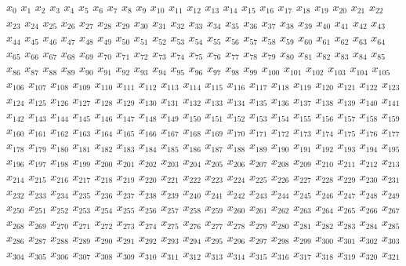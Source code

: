 \begin{diagram}[id="d", label="math cap"]
\end{diagram}

$x_{0}$ $x_{1}$ $x_{2}$ $x_{3}$ $x_{4}$ $x_{5}$ $x_{6}$ $x_{7}$ $x_{8}$ $x_{9}$ $x_{10}$ $x_{11}$ $x_{12}$ $x_{13}$ $x_{14}$ $x_{15}$ $x_{16}$ $x_{17}$ $x_{18}$ $x_{19}$ $x_{20}$ $x_{21}$ $x_{22}$ $x_{23}$ $x_{24}$ $x_{25}$ $x_{26}$ $x_{27}$ $x_{28}$ $x_{29}$ $x_{30}$ $x_{31}$ $x_{32}$ $x_{33}$ $x_{34}$ $x_{35}$ $x_{36}$ $x_{37}$ $x_{38}$ $x_{39}$ $x_{40}$ $x_{41}$ $x_{42}$ $x_{43}$ $x_{44}$ $x_{45}$ $x_{46}$ $x_{47}$ $x_{48}$ $x_{49}$ $x_{50}$ $x_{51}$ $x_{52}$ $x_{53}$ $x_{54}$ $x_{55}$ $x_{56}$ $x_{57}$ $x_{58}$ $x_{59}$ $x_{60}$ $x_{61}$ $x_{62}$ $x_{63}$ $x_{64}$ $x_{65}$ $x_{66}$ $x_{67}$ $x_{68}$ $x_{69}$ $x_{70}$ $x_{71}$ $x_{72}$ $x_{73}$ $x_{74}$ $x_{75}$ $x_{76}$ $x_{77}$ $x_{78}$ $x_{79}$ $x_{80}$ $x_{81}$ $x_{82}$ $x_{83}$ $x_{84}$ $x_{85}$ $x_{86}$ $x_{87}$ $x_{88}$ $x_{89}$ $x_{90}$ $x_{91}$ $x_{92}$ $x_{93}$ $x_{94}$ $x_{95}$ $x_{96}$ $x_{97}$ $x_{98}$ $x_{99}$ $x_{100}$ $x_{101}$ $x_{102}$ $x_{103}$ $x_{104}$ $x_{105}$ $x_{106}$ $x_{107}$ $x_{108}$ $x_{109}$ $x_{110}$ $x_{111}$ $x_{112}$ $x_{113}$ $x_{114}$ $x_{115}$ $x_{116}$ $x_{117}$ $x_{118}$ $x_{119}$ $x_{120}$ $x_{121}$ $x_{122}$ $x_{123}$ $x_{124}$ $x_{125}$ $x_{126}$ $x_{127}$ $x_{128}$ $x_{129}$ $x_{130}$ $x_{131}$ $x_{132}$ $x_{133}$ $x_{134}$ $x_{135}$ $x_{136}$ $x_{137}$ $x_{138}$ $x_{139}$ $x_{140}$ $x_{141}$ $x_{142}$ $x_{143}$ $x_{144}$ $x_{145}$ $x_{146}$ $x_{147}$ $x_{148}$ $x_{149}$ $x_{150}$ $x_{151}$ $x_{152}$ $x_{153}$ $x_{154}$ $x_{155}$ $x_{156}$ $x_{157}$ $x_{158}$ $x_{159}$ $x_{160}$ $x_{161}$ $x_{162}$ $x_{163}$ $x_{164}$ $x_{165}$ $x_{166}$ $x_{167}$ $x_{168}$ $x_{169}$ $x_{170}$ $x_{171}$ $x_{172}$ $x_{173}$ $x_{174}$ $x_{175}$ $x_{176}$ $x_{177}$ $x_{178}$ $x_{179}$ $x_{180}$ $x_{181}$ $x_{182}$ $x_{183}$ $x_{184}$ $x_{185}$ $x_{186}$ $x_{187}$ $x_{188}$ $x_{189}$ $x_{190}$ $x_{191}$ $x_{192}$ $x_{193}$ $x_{194}$ $x_{195}$ $x_{196}$ $x_{197}$ $x_{198}$ $x_{199}$ $x_{200}$ $x_{201}$ $x_{202}$ $x_{203}$ $x_{204}$ $x_{205}$ $x_{206}$ $x_{207}$ $x_{208}$ $x_{209}$ $x_{210}$ $x_{211}$ $x_{212}$ $x_{213}$ $x_{214}$ $x_{215}$ $x_{216}$ $x_{217}$ $x_{218}$ $x_{219}$ $x_{220}$ $x_{221}$ $x_{222}$ $x_{223}$ $x_{224}$ $x_{225}$ $x_{226}$ $x_{227}$ $x_{228}$ $x_{229}$ $x_{230}$ $x_{231}$ $x_{232}$ $x_{233}$ $x_{234}$ $x_{235}$ $x_{236}$ $x_{237}$ $x_{238}$ $x_{239}$ $x_{240}$ $x_{241}$ $x_{242}$ $x_{243}$ $x_{244}$ $x_{245}$ $x_{246}$ $x_{247}$ $x_{248}$ $x_{249}$ $x_{250}$ $x_{251}$ $x_{252}$ $x_{253}$ $x_{254}$ $x_{255}$ $x_{256}$ $x_{257}$ $x_{258}$ $x_{259}$ $x_{260}$ $x_{261}$ $x_{262}$ $x_{263}$ $x_{264}$ $x_{265}$ $x_{266}$ $x_{267}$ $x_{268}$ $x_{269}$ $x_{270}$ $x_{271}$ $x_{272}$ $x_{273}$ $x_{274}$ $x_{275}$ $x_{276}$ $x_{277}$ $x_{278}$ $x_{279}$ $x_{280}$ $x_{281}$ $x_{282}$ $x_{283}$ $x_{284}$ $x_{285}$ $x_{286}$ $x_{287}$ $x_{288}$ $x_{289}$ $x_{290}$ $x_{291}$ $x_{292}$ $x_{293}$ $x_{294}$ $x_{295}$ $x_{296}$ $x_{297}$ $x_{298}$ $x_{299}$ $x_{300}$ $x_{301}$ $x_{302}$ $x_{303}$ $x_{304}$ $x_{305}$ $x_{306}$ $x_{307}$ $x_{308}$ $x_{309}$ $x_{310}$ $x_{311}$ $x_{312}$ $x_{313}$ $x_{314}$ $x_{315}$ $x_{316}$ $x_{317}$ $x_{318}$ $x_{319}$ $x_{320}$ $x_{321}$ 